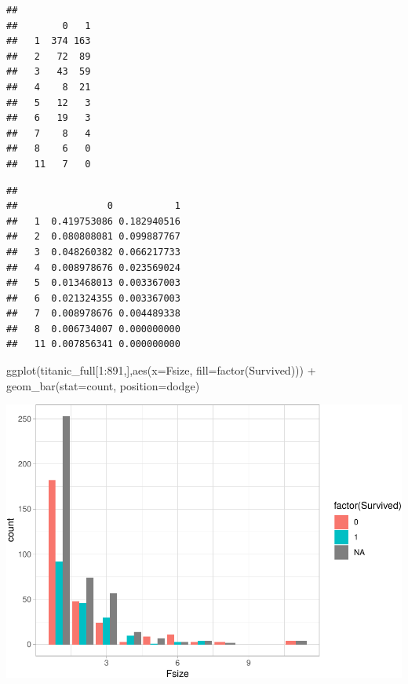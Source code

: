\documentclass[
]{article}
\newenvironment{Shaded}{\begin{snugshade}}{\end{snugshade}}
\newcommand{\AttributeTok}[1]{\textcolor[rgb]{0.77,0.63,0.00}{#1}}
\newcommand{\DecValTok}[1]{\textcolor[rgb]{0.00,0.00,0.81}{#1}}
\newcommand{\FunctionTok}[1]{\textcolor[rgb]{0.00,0.00,0.00}{#1}}
\newcommand{\NormalTok}[1]{#1}
\newcommand{\SpecialCharTok}[1]{\textcolor[rgb]{0.00,0.00,0.00}{#1}}
\newcommand{\StringTok}[1]{\textcolor[rgb]{0.31,0.60,0.02}{#1}}
\begin{document}
\begin{verbatim}
##     
##        0   1
##   1  374 163
##   2   72  89
##   3   43  59
##   4    8  21
##   5   12   3
##   6   19   3
##   7    8   4
##   8    6   0
##   11   7   0
\end{verbatim}

\begin{Shaded}
\end{Shaded}

\begin{verbatim}
##     
##                0           1
##   1  0.419753086 0.182940516
##   2  0.080808081 0.099887767
##   3  0.048260382 0.066217733
##   4  0.008978676 0.023569024
##   5  0.013468013 0.003367003
##   6  0.021324355 0.003367003
##   7  0.008978676 0.004489338
##   8  0.006734007 0.000000000
##   11 0.007856341 0.000000000
\end{verbatim}

\begin{Shaded}
\begin{Highlighting}[]
\FunctionTok{ggplot}\NormalTok{(titanic\_full[}\DecValTok{1}\SpecialCharTok{:}\DecValTok{891}\NormalTok{,],}\FunctionTok{aes}\NormalTok{(}\AttributeTok{x=}\NormalTok{Fsize, }\AttributeTok{fill=}\FunctionTok{factor}\NormalTok{(Survived))) }\SpecialCharTok{+}
  \FunctionTok{geom\_bar}\NormalTok{(}\AttributeTok{stat=}\StringTok{\textquotesingle{}count\textquotesingle{}}\NormalTok{, }\AttributeTok{position=}\StringTok{\textquotesingle{}dodge\textquotesingle{}}\NormalTok{)}
\end{Highlighting}
\end{Shaded}

\includegraphics{final_pdf_files/figure-latex/unnamed-chunk-15-1.pdf}
\end{document}

